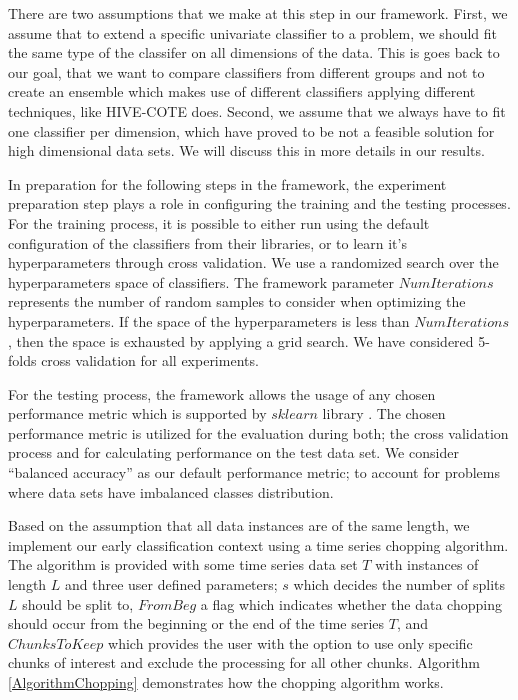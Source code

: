There are two assumptions that we make at this step in our framework.
First, we assume that to extend a specific univariate classifier to a problem, we should fit the same type of the classifer on all dimensions of the data.
This is goes back to our goal, that we want to compare classifiers from different groups and not to create an ensemble which makes use of different classifiers
applying different techniques, like HIVE-COTE does.
Second, we assume that we always have to fit one classifier per dimension, which have proved to be not a feasible solution for high dimensional data sets.
We will discuss this in more details in our results.

In preparation for the following steps in the framework, the experiment preparation step plays a role in configuring the training and the testing processes.
For the training process, it is possible to either run using the default configuration of the classifiers from their libraries, or to learn it's hyperparameters through cross validation.
We use a randomized search over the hyperparameters space of classifiers.
The framework parameter $NumIterations$ represents the number of random samples to consider when optimizing the hyperparameters.
If the space of the hyperparameters is less than $NumIterations$, then the space is exhausted by applying a grid search. We have considered 5-folds cross validation for all experiments.

For the testing process, the framework allows the usage of any chosen performance metric which is supported by $sklearn$ library \cite{scikit-learn}.
The chosen performance metric is utilized for the evaluation during both; the cross validation process and for calculating performance on the test data set.
We consider \enquote{balanced accuracy} as our default performance metric; to account for problems where data sets have imbalanced classes distribution.

Based on the assumption that all data instances are of the same length, we implement our early classification context using a time series chopping algorithm.
The algorithm is provided with some time series data set $T$ with instances of length $L$ and three user defined parameters; $s$ which decides the number of splits $L$ should be split to,
$FromBeg$ a flag which indicates whether the data chopping should occur from the beginning or the end of the time series $T$, and $ChunksToKeep$ which provides the user
with the option to use only specific chunks of interest and exclude the processing for all other chunks.
Algorithm \ref{AlgorithmChopping} demonstrates how the chopping algorithm works.

